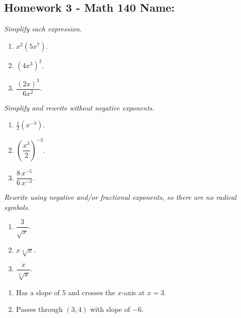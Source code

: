 \documentclass[10pt]{article}
\begin{document}
\pagestyle{empty}
\subsection*{Homework 3 - Math 140 \hfill Name: \underline{\hspace*{2in}}}


\noindent 
\textit{Simplify each expression.}
\begin{multicols}{3}
\begin{enumerate}
\setcounter{enumi}{\theenumCount}
\item $x^2 (5x^7)$.
\item $(4x^3)^2$.
\item $\dfrac{(2x)^3}{6 x^2}$.
\setcounter{enumCount}{\theenumi}
\end{enumerate}
\end{multicols}
\vfill

\noindent
\textit{Simplify and rewrite without negative exponents.}
\begin{multicols}{3}
\begin{enumerate}
\setcounter{enumi}{\theenumCount}
\item $\frac{1}{2} (x^{-3})$.
\item $\left(\dfrac{x^3}{2}\right)^{-3}$.
\item $\dfrac{8 \, x^{-5}}{6 \, x^{-3}}$.
\setcounter{enumCount}{\theenumi}
\end{enumerate}
\end{multicols}
\vfill

\noindent 
\textit{Rewrite using negative and/or fractional exponents, so there are no radical symbols.}
\begin{multicols}{3}
\begin{enumerate}
\setcounter{enumi}{\theenumCount}
\item $\dfrac{3}{\sqrt{x}}$.
\item $x \sqrt[4]{x}$.
\item $\dfrac{x}{\sqrt[3]{x}}$.
\setcounter{enumCount}{\theenumi}
\end{enumerate}
\end{multicols}
\vfill


\begin{multicols}{2}
\begin{enumerate}
\setcounter{enumi}{\theenumCount}
\item Has a slope of 5 and crosses the $x$-axis at $x=3$.
\item Passes through $(3,4)$ with slope of $-6$.
\setcounter{enumCount}{\theenumi}
\end{enumerate}
\end{multicols}
\vfill
\end{document}
